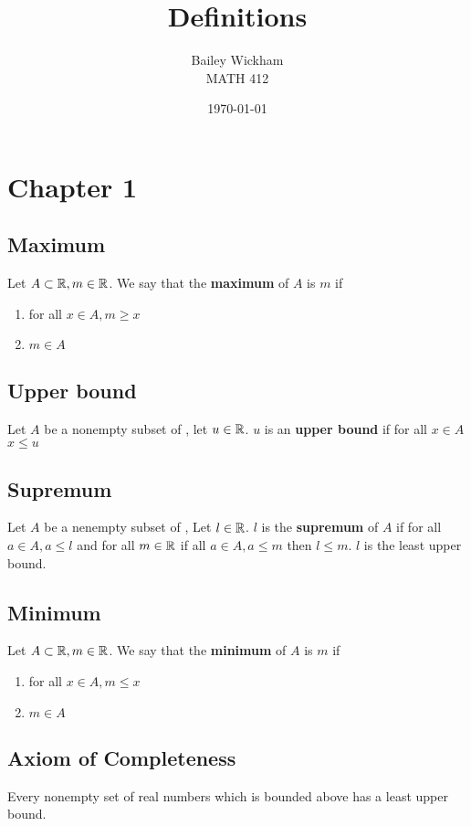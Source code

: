 \documentclass{article}
\title{Definitions}
\author{Bailey Wickham \\ MATH 412}
\date\today
\begin{document}
\maketitle

\section{Chapter 1}
\subsection{Maximum}
Let $A \subset \protect\mathbb{R}, m \in \protect\mathbb{R}$. We say that the \textbf{maximum} of $A$ is $m$ if
\begin{enumerate}
    \item for all $x \in A, m \ge x$
    \item $m \in A$
\end{enumerate}

\subsection{Upper bound}
Let $A$ be a nonempty subset of \bR, let $u \in \protect\mathbb{R}$. $u$ is an \textbf{upper bound} if for all $x\in A$ $x \le u$

\subsection{Supremum}
Let $A$ be a nenempty subset of \bR, Let $l \in \protect\mathbb{R}$. $l$ is the \textbf{supremum} of $A$ if for all $a \in A, a \le l$ and for all $m \in \protect\mathbb{R}$ if all $a \in A, a \le m$ then $l\le m$. $l$ is the least upper bound.

\subsection{Minimum}
Let $A \subset \protect\mathbb{R}, m \in \protect\mathbb{R}$. We say that the \textbf{minimum} of $A$ is $m$ if
\begin{enumerate}
    \item for all $x \in A, m \le x$
    \item $m \in A$
\end{enumerate}

\subsection{Axiom of Completeness}
Every nonempty set of real numbers which is bounded above has a least upper bound.
\end{document}
